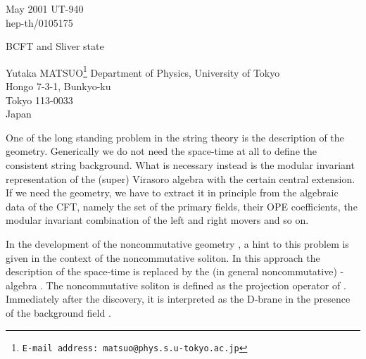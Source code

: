 \documentclass[a4paper,12pt]{article}
\begin{document}
\begin{titlepage}
\nopagebreak
%
%
\begin{flushright}
May 2001\hfill
UT-940\\
hep-th/0105175
\end{flushright}

\renewcommand{\thefootnote}{\fnsymbol{footnote}}
\vfill
\begin{center}
{\Large BCFT and Sliver state}%

\vskip 20mm

Yutaka MATSUO\footnote{
{\tt E-mail address: matsuo@phys.s.u-tokyo.ac.jp}
}
\vskip 1cm
Department of Physics, University of Tokyo\\
Hongo 7-3-1, Bunkyo-ku\\
Tokyo 113-0033\\
Japan
\end{center}
\vfill

\begin{abstract}
We give a comment on the possible r\^ole of
the sliver state in the generic boundary conformal
field theory. We argue that for each Cardy state,
there exists at least one projector in the string field theory.
\end{abstract}

\vfill
\end{titlepage}

One of the long standing problem in the string theory is the
description of the geometry.  Generically we do not need
the space-time at all to define
the consistent string background.  What is necessary instead is
the modular invariant representation of the (super) Virasoro
algebra with the certain central extension.
If we need the geometry, we have to extract it in principle from the
algebraic data of the CFT, namely the set of the primary fields,
their OPE coefficients, the modular invariant combination of
the left and right movers and so on.

In the development of the noncommutative geometry
\cite{r-CDS, r-SW}, a hint
to this problem is given in the context of the noncommutative
soliton\cite{r-GMS}.  In this approach the description of the space-time
is replaced by the (in general noncommutative) \coordHE{}-algebra \coordHE{}.
The noncommutative soliton is defined as the projection operator
of \coordHE{}.  Immediately after the discovery, it is 
interpreted as the D-brane in the presence of the background \coordHE{}
field \cite{r-HKLM}.
\end{document}
